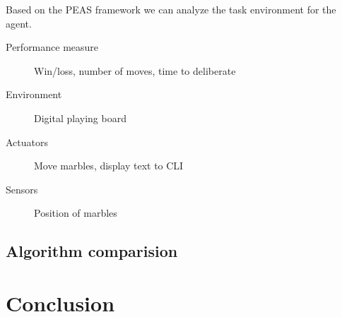 \documentclass{llncs}
\begin{document}
Based on the PEAS framework we can analyze the task environment for the agent. \cite[p.107]{russell_artificial_2021}

\begin{description}
  \item[Performance measure] Win/loss, number of moves, time to deliberate
  \item[Environment] Digital playing board
  \item[Actuators] Move marbles, display text to CLI
  \item[Sensors] Position of marbles
\end{description}



\subsection{Algorithm comparision}

\subsection{}

\section{Conclusion}



\end{document}
